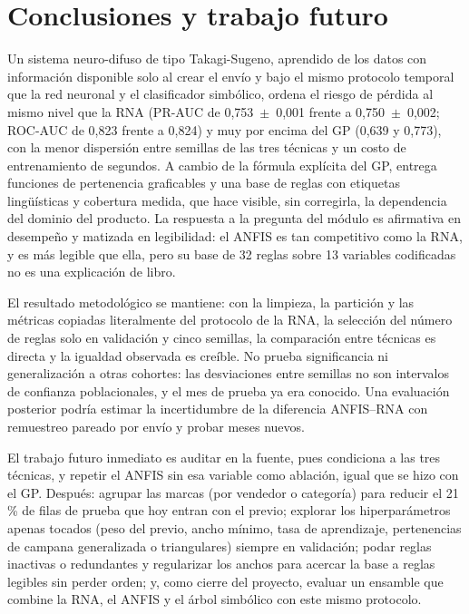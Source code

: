 \documentclass[conference]{IEEEtran}
\newcommand{\col}[1]{\texttt{\detokenize{#1}}}
\begin{document}
\section{Conclusiones y trabajo futuro}

Un sistema neuro-difuso de tipo Takagi-Sugeno, aprendido de los datos con
información disponible solo al crear el envío y bajo el mismo protocolo
temporal que la red neuronal y el clasificador simbólico, ordena el riesgo de
pérdida al mismo nivel que la RNA (PR-AUC de 0,753~$\pm$~0,001 frente a
0,750~$\pm$~0,002; ROC-AUC de 0,823 frente a 0,824) y muy por encima del GP
(0,639 y 0,773), con la menor dispersión entre semillas de las tres técnicas
y un costo de entrenamiento de segundos. A cambio de la fórmula explícita del
GP, entrega funciones de pertenencia graficables y una base de reglas con
etiquetas lingüísticas y cobertura medida, que hace visible, sin corregirla,
la dependencia del dominio del producto. La respuesta a la pregunta del
módulo es afirmativa en desempeño y matizada en legibilidad: el ANFIS es tan
competitivo como la RNA, y es más legible que ella, pero su base de 32 reglas
sobre 13 variables codificadas no es una explicación de libro.

El resultado metodológico se mantiene: con la limpieza, la partición y las
métricas copiadas literalmente del protocolo de la RNA, la selección del
número de reglas solo en validación y cinco semillas, la comparación entre
técnicas es directa y la igualdad observada es creíble. No prueba
significancia ni generalización a otras cohortes: las desviaciones entre
semillas no son intervalos de confianza poblacionales, y el mes de prueba ya
era conocido. Una evaluación posterior podría estimar la incertidumbre de la
diferencia ANFIS--RNA con remuestreo pareado por envío y probar meses nuevos.

El trabajo futuro inmediato es auditar \col{DOM_DOMAIN_ID} en la fuente,
pues condiciona a las tres técnicas, y repetir el ANFIS sin esa variable como
ablación, igual que se hizo con el GP. Después: agrupar las marcas (por
vendedor o categoría) para reducir el 21\,\% de filas de prueba que hoy
entran con el previo; explorar los hiperparámetros apenas tocados (peso del
previo, ancho mínimo, tasa de aprendizaje, pertenencias de campana
generalizada o triangulares) siempre en validación; podar reglas inactivas o
redundantes y regularizar los anchos para acercar la base a reglas legibles
sin perder orden; y, como cierre del proyecto, evaluar un ensamble que
combine la RNA, el ANFIS y el árbol simbólico con este mismo protocolo.
\end{document}
